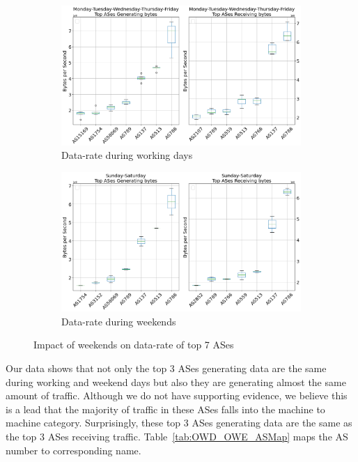 \documentclass[10pt, journal, letterpaper]{IEEEtran}
\begin{document}
\begin{figure}[hbt!]
    \centering
    \begin{subfigure}{\columnwidth}
          \centering
          \includegraphics[width=\columnwidth]{img/OWD_top7ASes_bps.png}
          \caption{Data-rate during working days}
          \label{fig:OWD_topAS_bps}
    \end{subfigure}
    \begin{subfigure}{\columnwidth}
          \centering
          \includegraphics[width=\columnwidth]{img/OWE_top7ASes_bps.png}
          \caption{Data-rate during weekends}
          \label{fig:OWE_topAS_bps}
    \end{subfigure}
    \caption{Impact of weekends on data-rate of top 7 ASes}
    \label{fig:topAS_bps_OWD_OWE}
\end{figure}
Our data shows that not only the top 3 ASes generating data are the same during working and weekend days but also they are generating almost the same amount of traffic. Although we do not have supporting evidence, we believe this is a lead that the majority of traffic in these ASes falls into the machine to machine category. Surprisingly, these top 3 ASes generating data are the same as the top 3 ASes receiving traffic.  Table~\ref{tab:OWD_OWE_ASMap} maps the AS number to corresponding name. 
\end{document}
